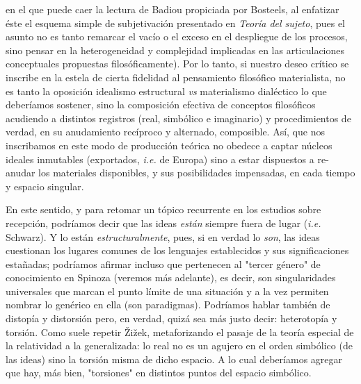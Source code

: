 \documentclass{book}
\begin{document}
en el que puede caer la lectura de Badiou propiciada por Bosteels, al
enfatizar éste el esquema simple de subjetivación presentado en
\emph{Teoría del sujeto}, pues el asunto no es tanto remarcar el vacío o
el exceso en el despliegue de los procesos, sino pensar en la
heterogeneidad y complejidad implicadas en las articulaciones
conceptuales propuestas filosóficamente). Por lo tanto, si nuestro deseo
crítico se inscribe en la estela de cierta fidelidad al pensamiento
filosófico materialista, no es tanto la oposición idealismo estructural
\emph{vs} materialismo dialéctico lo que deberíamos sostener, sino la
composición efectiva de conceptos filosóficos acudiendo a distintos
registros (real, simbólico e imaginario) y procedimientos de verdad, en
su anudamiento recíproco y alternado, composible. Así, que nos
inscribamos en este modo de producción teórica no obedece a captar
núcleos ideales inmutables (exportados, \emph{i.e.} de Europa) sino a
estar dispuestos a re-anudar los materiales disponibles, y sus
posibilidades impensadas, en cada tiempo y espacio singular.

En este sentido, y para retomar un tópico recurrente en los estudios
sobre recepción, podríamos decir que las ideas \emph{están} siempre
fuera de lugar (\emph{i.e.} Schwarz). Y lo están
\emph{estructuralmente}, pues, si en verdad lo \emph{son}, las ideas
cuestionan los lugares comunes de los lenguajes establecidos y sus
significaciones estañadas; podríamos afirmar incluso que pertenecen al
"tercer género" de conocimiento en Spinoza (veremos más adelante), es
decir, son singularidades universales que marcan el punto límite de una
situación y a la vez permiten nombrar lo genérico en ella (son
paradigmas). Podríamos hablar también de distopía y distorsión pero, en
verdad, quizá sea más justo decir: heterotopía y torsión. Como suele
repetir Žižek, metaforizando el pasaje de la teoría especial de la
relatividad a la generalizada: lo real no es un agujero en el orden
simbólico (de las ideas) sino la torsión misma de dicho espacio. A lo
cual deberíamos agregar que hay, más bien, "torsiones" en distintos
puntos del espacio simbólico.
\end{document}
